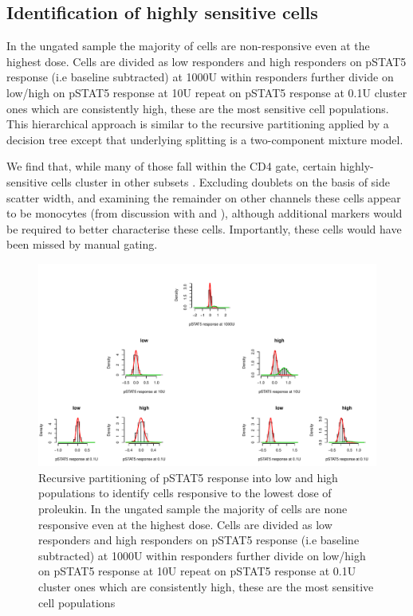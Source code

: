 \subsection{Identification of highly sensitive cells}

In the ungated sample the majority of cells are non-responsive even at the highest dose.
Cells are divided as low responders and high responders on pSTAT5 response (i.e baseline subtracted) at 1000U 
within responders further divide on low/high on pSTAT5 response at 10U
repeat on pSTAT5 response at 0.1U
cluster ones which are consistently high, these are the most sensitive cell populations.
This hierarchical approach is similar to the recursive partitioning applied by a decision tree except that underlying splitting is a two-component mixture model.

We find that, while many of those fall within the CD4 gate, certain highly-sensitive cells cluster in other subsets .
Excluding doublets on the basis of side scatter width,
and examining the remainder on other channels these cells appear to be monocytes (from discussion with  and ),
although additional markers would be required to better characterise these cells.
Importantly, these cells would have been missed by manual gating.


\hspace{-2cm}
\begin{figure}[h]
\centering
\includegraphics[scale=.5]{IL2/figures/pstat5-rpart.pdf}
{ Recursive partitioning of pSTAT5 response into low and high populations to identify cells responsive to the lowest dose of proleukin. }
{
In the ungated sample the majority of cells are none responsive even at the highest dose.
Cells are divided as low responders and high responders on pSTAT5 response (i.e baseline subtracted) at 1000U 
within responders further divide on low/high on pSTAT5 response at 10U
repeat on pSTAT5 response at 0.1U
cluster ones which are consistently high, these are the most sensitive cell populations 
}
\end{figure}


